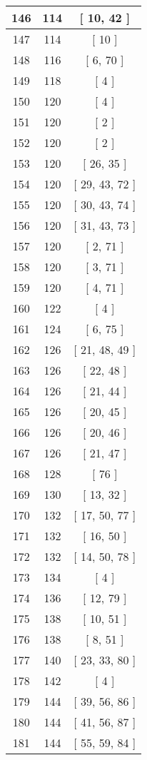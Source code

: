\begin{center}
\begin{longtable}[H]{|| c c c ||}
\hline
146 & 114 & [ 10, 42 ] \\ 
\hline
147 & 114 & [ 10 ] \\ 
\hline
148 & 116 & [ 6, 70 ] \\ 
\hline
149 & 118 & [ 4 ] \\ 
\hline
150 & 120 & [ 4 ] \\ 
\hline
151 & 120 & [ 2 ] \\ 
\hline
152 & 120 & [ 2 ] \\ 
\hline
153 & 120 & [ 26, 35 ] \\ 
\hline
154 & 120 & [ 29, 43, 72 ] \\ 
\hline
155 & 120 & [ 30, 43, 74 ] \\ 
\hline
156 & 120 & [ 31, 43, 73 ] \\ 
\hline
157 & 120 & [ 2, 71 ] \\ 
\hline
158 & 120 & [ 3, 71 ] \\ 
\hline
159 & 120 & [ 4, 71 ] \\ 
\hline
160 & 122 & [ 4 ] \\ 
\hline
161 & 124 & [ 6, 75 ] \\ 
\hline
162 & 126 & [ 21, 48, 49 ] \\ 
\hline
163 & 126 & [ 22, 48 ] \\ 
\hline
164 & 126 & [ 21, 44 ] \\ 
\hline
165 & 126 & [ 20, 45 ] \\ 
\hline
166 & 126 & [ 20, 46 ] \\ 
\hline
167 & 126 & [ 21, 47 ] \\ 
\hline
168 & 128 & [ 76 ] \\ 
\hline
169 & 130 & [ 13, 32 ] \\ 
\hline
170 & 132 & [ 17, 50, 77 ] \\ 
\hline
171 & 132 & [ 16, 50 ] \\ 
\hline
172 & 132 & [ 14, 50, 78 ] \\ 
\hline
173 & 134 & [ 4 ] \\ 
\hline
174 & 136 & [ 12, 79 ] \\ 
\hline
175 & 138 & [ 10, 51 ] \\ 
\hline
176 & 138 & [ 8, 51 ] \\ 
\hline
177 & 140 & [ 23, 33, 80 ] \\ 
\hline
178 & 142 & [ 4 ] \\ 
\hline
179 & 144 & [ 39, 56, 86 ] \\ 
\hline
180 & 144 & [ 41, 56, 87 ] \\ 
\hline
181 & 144 & [ 55, 59, 84 ] \\ 

\end{longtable}
\end{center}
